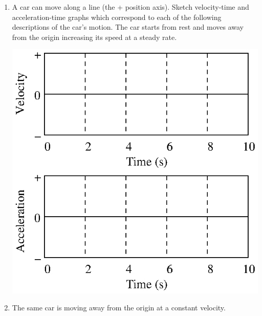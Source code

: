 \begin{enumerate}
\item A car can move along a line (the + position axis). Sketch velocity-time and
acceleration-time graphs which correspond to each of the following descriptions
of the car's motion.
The car starts from rest and moves away from the origin increasing its speed
at a steady rate.

\vspace{0.3cm}
{\par\centering \includegraphics{iqsRelatingMotion/changing_fig12.eps} \par}
\vspace{0.3cm}

\item The same car is moving away from the origin at a constant velocity.


\end{enumerate}
